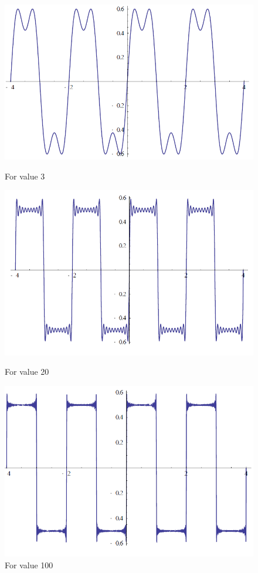 \documentclass[12pt]{article}
\begin{document}
\begin{figure}[H]
\centering
\includegraphics[scale=0.3]{P4.jpg}
\caption{For value 3}
\includegraphics[scale=0.3]{P5.jpg}
\caption{For value 20}
\includegraphics[scale=0.3]{P6.jpg}
\caption{For value 100}
\end{figure}
\end{document}
